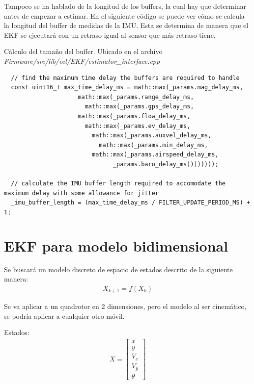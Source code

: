 
Tampoco se ha hablado de la longitud de los buffers, la cual hay que determinar antes de empezar a estimar. En el siguiente código se puede ver cómo se calcula la longitud del buffer de medidas de la IMU. Esta se determina de manera que el EKF se ejecutará con un retraso igual al sensor que más retraso tiene.
\begin{codigo}{Cálculo del tamaño del buffer. Ubicado en el archivo \textit{Firmware/src/lib/ecl/EKF/estimator\_interface.cpp}}
\begin{verbatim}
  // find the maximum time delay the buffers are required to handle
  const uint16_t max_time_delay_ms = math::max(_params.mag_delay_ms,
  				     math::max(_params.range_delay_ms,
  				       math::max(_params.gps_delay_ms,
  					 math::max(_params.flow_delay_ms,
  					   math::max(_params.ev_delay_ms,
  					     math::max(_params.auxvel_delay_ms,
  					       math::max(_params.min_delay_ms,
  						 math::max(_params.airspeed_delay_ms,
  						       _params.baro_delay_ms))))))));
  
  // calculate the IMU buffer length required to accomodate the maximum delay with some allowance for jitter
  _imu_buffer_length = (max_time_delay_ms / FILTER_UPDATE_PERIOD_MS) + 1;
\end{verbatim}
\end{codigo} 


\section{EKF para modelo bidimensional}
Se buscará un modelo discreto de espacio de estados descrito de la siguiente manera:
\begin{align}
X_{k+1} =  f(X_k)
\end{align}

Se va aplicar a un quadrotor en 2 dimensiones, pero el modelo al ser cinemático, se podría aplicar a cualquier otro móvil.

Estados:
\begin{align}
X = 
\begin{bmatrix} 
x \\ y \\ V_x \\ V_y \\ \theta
\end{bmatrix}
\end{align}

